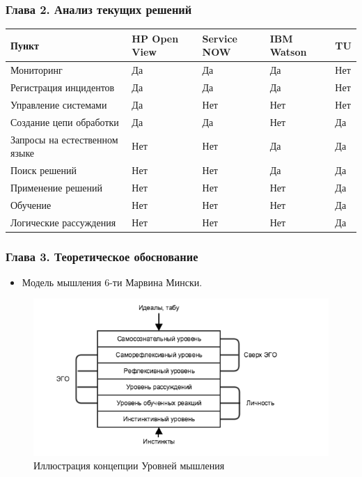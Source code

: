 \documentclass[14pt]{beamer}
\begin{document}
\begin{frame}
\frametitle{Глава 2. Анализ текущих решений}
\begin{table}
	
\small
\begin{tabular} {|p{5cm}|p{1cm}|p{1cm}|p{1cm}|p{1cm}|}

\hline
\textbf{Пункт} & HP Open View & Service NOW & IBM Watson & TU\\
\hline
   Мониторинг & Да & Да & Да & Нет \\
   \hline
   Регистрация инцидентов & Да & Да & Да & Нет\\
   \hline
   Управление системами & Да & Нет & Нет & Нет \\
   \hline 
   Создание цепи обработки & Да & Да & Нет & Да \\
   \hline 
   Запросы на естественном языке & Нет & Нет & Да & Да\\
   \hline 
   Поиск решений & Нет & Нет & Да & Да\\
   \hline 
   Применение решений & Нет & Нет & Нет & Да \\
   \hline
   Обучение & Нет & Нет & Нет & Да \\
   \hline
   Логические рассуждения & Нет & Нет & Нет & Да \\
   \hline
  
\end{tabular}
\end{table}
\end{frame}

\begin{frame}
\frametitle{Глава 3. Теоретическое обоснование}
	\begin{itemize}
		\item  Модель мышления 6-ти Марвина Мински.
	\end{itemize}
\begin{figure} [h] 
  \center
  \includegraphics [scale=0.6] {thinkinglevels}
  \caption{Иллюстрация концепции Уровней мышления} 
  \label{img:thinkinglevels}  
\end{figure}
\end{frame}
\end{document}

